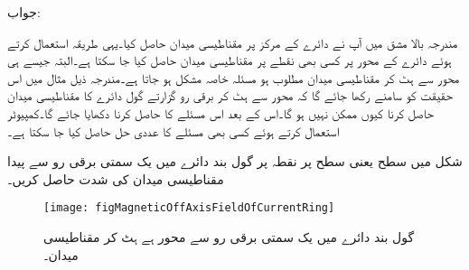 جواب: 

مندرجہ بالا مشق میں آپ نے دائرے کے مرکز پر مقناطیسی میدان حاصل کیا۔یہی طریقہ استعمال کرتے ہوئے دائرے کے محور پر کسی بھی نقطے پر مقناطیسی میدان حاصل کیا جا سکتا ہے۔البتہ جیسے ہی محور سے ہٹ کر مقناطیسی میدان مطلوب ہو مسئلہ خاصہ مشکل ہو جاتا ہے۔مندرجہ ذیل مثال میں اس حقیقت کو سامنے رکھا جائے گا کہ محور سے ہٹ کر برقی رو گزارتے گول دائرے کا مقناطیسی میدان حاصل کرنا کیوں ممکن نہیں ہو گا۔اس کے بعد  اس مسئلے کا  حاصل کرنا دکھایا جائے گا۔کمپیوٹر استعمال کرتے ہوئے کسی بھی مسئلے کا عددی حل حاصل کیا جا سکتا ہے۔

شکل  میں  سطح یعنی  سطح پر نقطہ  پر گول بند دائرے میں یک سمتی برقی رو سے پیدا مقناطیسی میدان کی شدت حاصل کریں۔ 
\begin{figure}
\centering
\texttt{[image: figMagneticOffAxisFieldOfCurrentRing]}
\caption{گول بند دائرے میں یک سمتی برقی رو سے محور ہے ہٹ کر مقناطیسی میدان۔}
\label{شکل_مقناطیسی_دائرہ_محور_سے_ہٹ_کر}
\end{figure}


